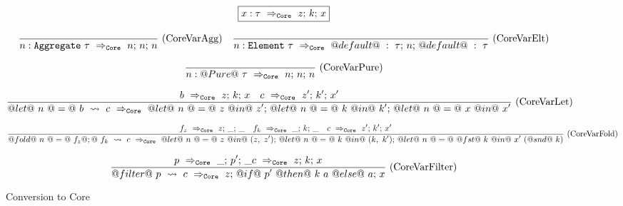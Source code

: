 
\begin{figure*}

$$
\boxed{\ToCore{x : \tau}{z}{k}{x}}
$$


$$
\ruleI
{
}
{ 
    \ToCore{n : \Agg{\tau}}{n}{n}{n}
}
\textrm{(CoreVarAgg)}
\quad
\ruleI
{
}
{ 
    \ToCore{n : \Elm{\tau}}{@default@~:~\tau}{n}{@default@~:~\tau}
}
\textrm{(CoreVarElt)}
$$

$$
\ruleI
{
}
{ 
    \ToCore{n : @Pure@~\tau}{n}{n}{n}
}
\textrm{(CoreVarPure)}
$$

$$
\ruleI
{
    \ToCore{b}{z}{k}{x}
    \quad
    \ToCore{c}{z'}{k'}{x'}
}
{ 
    \ToCore{@let@~n~@=@~b~\flowsinto~c}{@let@~n~@=@~z~@in@~z'}{@let@~n~@=@~k~@in@~k'}{@let@~n~@=@~x~@in@~x'}
}
\textrm{(CoreVarLet)}
$$

$$
\ruleI
{
    \ToCore{f_z}{z}{\_}{\_}
    \quad
    \ToCore{f_k}{\_}{k}{\_}
    \quad
    \ToCore{c}{z'}{k'}{x'}
}
{ 
    \ToCore{@fold@~n~@=@~f_z@;@~f_k~\flowsinto~c}{@let@~n~@=@~z~@in@~(z,~z')}{@let@~n~@=@~k~@in@~(k,~k')}{@let@~n~@=@~@fst@~k~@in@~x'~(@snd@~k)}
}
\textrm{(CoreVarFold)}
$$

$$
\ruleI
{
    \ToCore{p}{\_}{p'}{\_}
    \ToCore{c}{z}{k}{x}
}
{ 
    \ToCore{@filter@~p~\flowsinto~c}{z}{@if@~p'~@then@~k~a~@else@~a}{x}
}
\textrm{(CoreVarFilter)}
$$



\caption{Conversion to Core}
\label{fig:source:core}
\end{figure*}


